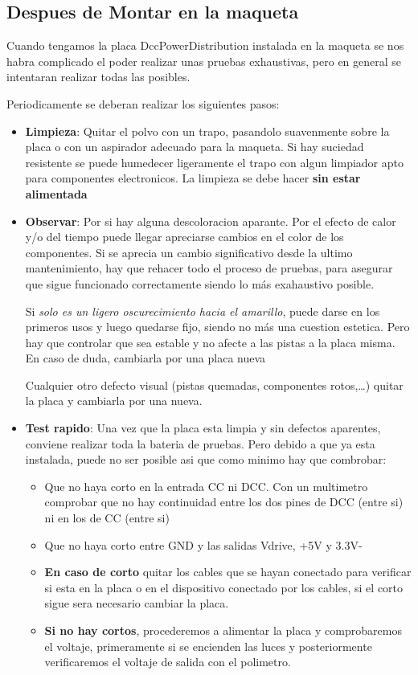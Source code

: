 \subsection{Despues de Montar en la maqueta}
Cuando tengamos la placa DccPowerDistribution instalada en la maqueta se nos habra complicado
el poder realizar unas pruebas exhaustivas, pero en general se intentaran realizar todas las posibles.

Periodicamente se deberan realizar los siguientes pasos:
\begin{itemize}
\item \textbf{Limpieza}: Quitar el polvo con un trapo, pasandolo suavenmente sobre la placa o con un aspirador adecuado para la maqueta.
Si hay suciedad resistente se puede humedecer ligeramente el trapo con algun limpiador apto para
componentes electronicos. La limpieza se debe hacer \textbf{sin estar alimentada}

\item \textbf{Observar}: Por si hay alguna descoloracion aparante. Por el efecto de calor y/o del tiempo puede llegar apreciarse cambios
en el color de los componentes. Si se aprecia un cambio significativo desde la ultimo mantenimiento,
hay que rehacer todo el proceso de pruebas, para asegurar que sigue funcionado correctamente siendo
lo más exahaustivo posible. 

Si \textit{solo es un ligero oscurecimiento hacia el amarillo}, puede darse en los primeros usos y
luego quedarse fijo, siendo no más una cuestion estetica. Pero hay que controlar que sea estable y
no afecte a las pistas a la placa misma. En caso de duda, cambiarla por una placa nueva

Cualquier otro defecto visual (pistas quemadas, componentes rotos,\dots) quitar la placa y cambiarla por una nueva.
\item \textbf{Test rapido}: Una vez que la placa esta limpia y sin defectos aparentes, conviene
realizar toda la bateria de pruebas. Pero debido a que ya esta instalada, puede no ser posible asi
que como minimo hay que combrobar:
\begin{itemize}
\item Que no haya corto en la entrada CC ni DCC. Con un multimetro comprobar que no hay continuidad entre los dos pines de DCC (entre si) ni en los de CC (entre si)
\item Que no haya corto entre GND y las salidas Vdrive, +5V y 3.3V-
\item \textbf{En caso de corto} quitar los cables que se hayan conectado para verificar si esta en la placa o en el dispositivo conectado por los cables, si el corto sigue sera necesario cambiar la placa.
\item \textbf{Si no hay cortos}, procederemos a alimentar la placa y comprobaremos el voltaje, primeramente si se encienden las luces y posteriormente verificaremos el voltaje de salida con el polimetro.
\end{itemize}

\end{itemize}

